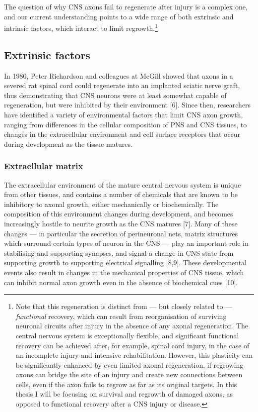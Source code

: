 \documentclass[
  12pt,
  a4paper,
]{book}
\begin{document}
The question of why CNS axons fail to regenerate after injury is a complex one, and our current understanding points to a wide range of both extrinsic and intrinsic factors, which interact to limit regrowth.\footnote{Note that this regeneration is distinct from --- but closely related to --- \emph{functional} recovery, which can result from reorganisation of surviving neuronal circuits after injury in the absence of any axonal regeneration. The central nervous system is exceptionally flexible, and significant functional recovery can be achieved after, for example, spinal cord injury, in the case of an incomplete injury and intensive rehabilitation. However, this plasticity can be significantly enhanced by even limited axonal regeneration, if regrowing axons can bridge the site of an injury and create new connections between cells, even if the axon fails to regrow as far as its original targets. In this thesis I will be focusing on survival and regrowth of damaged axons, as opposed to functional recovery after a CNS injury or disease.}

\hypertarget{extrinsic-factors}{%
\subsection{Extrinsic factors}\label{extrinsic-factors}}

In 1980, Peter Richardson and colleagues at McGill showed that axons in a severed rat spinal cord could regenerate into an implanted sciatic nerve graft, thus demonstrating that CNS neurons were at least somewhat capable of regeneration, but were inhibited by their environment {[}6{]}. Since then, researchers have identified a variety of environmental factors that limit CNS axon growth, ranging from differences in the cellular composition of PNS and CNS tissues, to changes in the extracellular environment and cell surface receptors that occur during development as the tissue matures.

\hypertarget{extraellular-matrix}{%
\subsubsection{Extraellular matrix}\label{extraellular-matrix}}

The extracellular environment of the mature central nervous system is unique from other tissues, and contains a number of chemicals that are known to be inhibitory to axonal growth, either mechanically or biochemically. The composition of this environment changes during development, and becomes increasingly hostile to neurite growth as the CNS matures {[}7{]}. Many of these changes --- in particular the secretion of perineuronal nets, matrix structures which surround certain types of neuron in the CNS --- play an important role in stabilising and supporting synapses, and signal a change in CNS state from supporting growth to supporting electrical signalling {[}8,9{]}. These developmental events also result in changes in the mechanical properties of CNS tissue, which can inhibit normal axon growth even in the absence of biochemical cues {[}10{]}.
\end{document}
